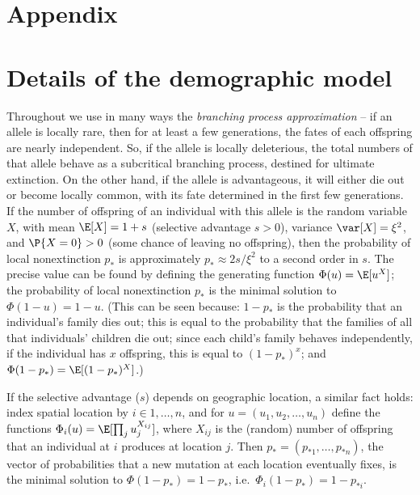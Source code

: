 
\renewcommand{\thefigure}{A\arabic{figure}}
\renewcommand{\thetable}{A\arabic{table}}

\section*{Appendix}

\section{Details of the demographic model}
\label{apx:demographic_model}

Throughout we use in many ways the {\em branching process approximation} --
if an allele is locally rare, then for at least a few generations,
the fates of each offspring are nearly independent.
So, if the allele is locally deleterious, the total numbers of that allele behave as a subcritical branching process,
destined for ultimate extinction.
On the other hand, if the allele is advantageous,
it will either die out or become locally common, with its fate determined in the first few generations.
If the number of offspring of an individual with this allele is the random variable $X$, 
with mean $\E[X] = 1+s$ (selective advantage $s>0$), variance $\var[X]=\xi^2$, and $\P\{X=0\}>0$ (some chance of leaving no offspring),
then the probability of local nonextinction $p_*$ is approximately $p_* \approx 2s/\xi^2$ to a second order in $s$.
The precise value can be found by defining the generating function $\Phi(u) = \E[u^X]$; 
the probability of local nonextinction $p_*$ is the minimal solution to $\Phi(1-u) = 1-u$.
(This can be seen because: $1-p_*$ is the probability that an individual's family dies out;
this is equal to the probability that the families of all that individuals' children die out;
since each child's family behaves independently, if the individual has $x$ offspring, this is equal to $(1-p_*)^x$;
and $\Phi(1-p_*) = \E[(1-p_*)^X]$.)

If the selective advantage ($s$) depends on geographic location, 
a similar fact holds: index spatial location by $i \in 1, \ldots, n$,
and for $u = (u_1,u_2,\ldots,u_n)$ define the functions $\Phi_i(u) = \E[ \prod_j u_j^{X_{ij}} ]$,
where $X_{ij}$ is the (random) number of offspring that an individual at $i$ produces at location $j$.
Then $p_* = (p_{*1}, \ldots, p_{*n})$, the vector of probabilities that a new mutation at each location eventually fixes,
is the minimal solution to $\Phi(1-p_*) = 1-p_*$,
i.e.\ $\Phi_i(1-p_*) = 1-p_{*i}$.

